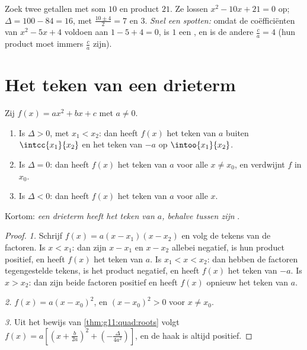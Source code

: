 \begin{example}
Zoek twee getallen met som $10$ en product $21$. Ze lossen
$x^2 - 10x + 21 = 0$ op; $\Delta = 100 - 84 = 16$, met 
$\frac{10 \pm 4}{2} = 7$ en $3$. \emph{Snel een  spotten:} omdat de
coëfficiënten van $x^2 - 5x + 4$ voldoen aan $1 - 5 + 4 = 0$, is $1$ een
, en is de andere $\frac{c}{a} = 4$ (hun product moet immers
$\frac ca$ zijn).
\end{example}

\section{Het teken van een drieterm}

\begin{theorem}\label{thm:g11:quad:sign}
Zij $f(x) = ax^2+bx+c$ met $a \neq 0$.
\begin{enumerate}
  \item Is $\Delta > 0$, met  $x_1 < x_2$: dan heeft $f(x)$ het teken
        van $a$ buiten $\intcc{x_1}{x_2}$ en het teken van $-a$ op
        $\intoo{x_1}{x_2}$.
  \item Is $\Delta = 0$: dan heeft $f(x)$ het teken van $a$ voor alle
        $x \neq x_0$, en verdwijnt $f$ in $x_0$.
  \item Is $\Delta < 0$: dan heeft $f(x)$ het teken van $a$ voor alle $x$.
\end{enumerate}
Kortom: \emph{een drieterm heeft het teken van $a$, behalve tussen zijn
}.
\end{theorem}

\begin{proof}
\emph{1.} Schrijf $f(x) = a(x-x_1)(x-x_2)$ en volg de tekens van de
factoren. Is $x < x_1$: dan zijn $x - x_1$ en $x - x_2$ allebei negatief, is
hun product positief, en heeft $f(x)$ het teken van $a$. Is
$x_1 < x < x_2$: dan hebben de factoren tegengestelde tekens, is het product
negatief, en heeft $f(x)$ het teken van $-a$. Is $x > x_2$: dan zijn beide
factoren positief en heeft $f(x)$ opnieuw het teken van $a$.

\emph{2.} $f(x) = a(x - x_0)^2$, en $(x-x_0)^2 > 0$ voor $x \neq x_0$.

\emph{3.} Uit het bewijs van \cref{thm:g11:quad:roots} volgt
$f(x) = a\left[\left(x + \frac{b}{2a}\right)^2 +
\left(-\frac{\Delta}{4a^2}\right)\right]$, en de haak is altijd positief.
\end{proof}


